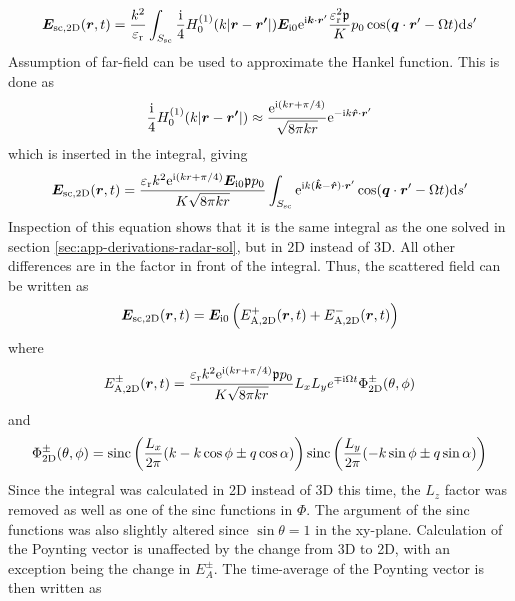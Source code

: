 \documentclass[11pt,twoside]{eitExjobb}
\begin{document}
	\begin{equation*}
		\bm{E}_{\mathrm{sc,2D}}(\bm{r},t) = \frac{k^2}{\varepsilon_{\mathrm{r}}} \int_{S_{\mathrm{sc}}} \frac{\mathrm{i}}{4} H_0^{(1)}( k |\bm{r}-\bm{r'}|) \bm{E}_{\mathrm{i}0} \mathrm{e}^{\mathrm{i} \bm{k} \cdot \bm{r}'} \frac{\varepsilon_{\mathrm{r}}^2 \mathfrak{p}}{K} p_0 \cos(\bm{q} \cdot \bm{r}' - \Omega t) \mathrm{d}s'
	\end{equation*}
	Assumption of far-field can be used to approximate the Hankel function. This is done as \addref {}
	\begin{equation*}
		\frac{\mathrm{i}}{4} H_0^{(1)}( k |\bm{r}-\bm{r'}|) \approx \frac{\mathrm{e}^{\mathrm{i} (kr + \pi/4)}}{\sqrt{8\pi kr}} \mathrm{e}^{-\mathrm{i} k \bm{\hat{r}} \cdot \bm{r}'}
	\end{equation*}
	which is inserted in the integral, giving
	\begin{equation*}
		\bm{E}_{\mathrm{sc,2D}}(\bm{r},t) = \frac{\varepsilon_{\mathrm{r}}k^2 \mathrm{e}^{\mathrm{i} (kr + \pi/4)} \bm{E}_{\mathrm{i}0} \mathfrak{p} p_0}{K \sqrt{8\pi kr}} \int_{S_{\mathrm{sc}}} \mathrm{e}^{\mathrm{i} k ( \bm{\hat{k}} - \bm{\hat{r}} ) \cdot \bm{r}'} \cos(\bm{q} \cdot \bm{r}' - \Omega t) \mathrm{d}s'
	\end{equation*}
	Inspection of this equation shows that it is the same integral as the one solved in section \ref{sec:app-derivations-radar-sol}, but in 2D instead of 3D. All other differences are in the factor in front of the integral. Thus, the scattered field can be written as
	\begin{equation*}
		\bm{E}_{\mathrm{sc,2D}} (\bm{r},t) = \bm{E}_{\mathrm{i}0} \left( E_{\mathrm{A,2D}}^+ (\bm{r},t) + E_{\mathrm{A,2D}}^- (\bm{r},t) \right)
	\end{equation*}
	where
	\begin{equation*}
		E_{\mathrm{A,2D}}^\pm (\bm{r},t) = \frac{\varepsilon_{\mathrm{r}}k^2 \mathrm{e}^{\mathrm{i} (kr + \pi/4)} \mathfrak{p} p_0}{K \sqrt{8\pi kr}} L_{x} L_{y} e^{\mp \mathrm{i} \Omega t} \Phi_{\mathrm{2D}}^\pm (\theta,\phi)
	\end{equation*}
	and
	\begin{equation*}
		\Phi_{\mathrm{2D}}^\pm (\theta,\phi) = \text{sinc} \left( \frac{L_{x}}{2\pi} ( k - k\cos{\phi} \pm q\cos{\alpha} ) \right) \text{sinc} \left( \frac{L_{y}}{2\pi} ( - k\sin{\phi} \pm q\sin{\alpha} ) \right)
	\end{equation*}
	Since the integral was calculated in 2D instead of 3D this time, the $L_z$ factor was removed as well as one of the sinc functions in $\Phi$. The argument of the sinc functions was also slightly altered since $\sin{\theta} = 1$ in the xy-plane. Calculation of the Poynting vector is unaffected by the change from 3D to 2D, with an exception being the change in $E_A^\pm$. The time-average of the Poynting vector is then written as
\end{document}
